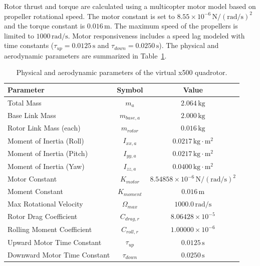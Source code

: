     Rotor thrust and torque are calculated using a multicopter motor model based on propeller rotational speed. The motor constant is set to $8.55 \times 10^{-6}\,\text{N}/(\text{rad/s})^2$ and the torque constant is $0.016\,\text{m}$. The maximum speed of the propellers is limited to $1000\,\text{rad/s}$. Motor responsiveness includes a speed lag modeled with time constants ($\tau_{up} = 0.0125\,\text{s}$ and $\tau_{down} = 0.0250\,\text{s}$). The physical and aerodynamic parameters are summarized in Table~\ref{tab:uav_parameters}.

    \begin{table}[H]
        \centering
        \caption{Physical and aerodynamic parameters of the virtual x500 quadrotor.}
        \label{tab:uav_parameters}
        \begin{tabular}{lcc}
            \toprule
            \textbf{Parameter} & \textbf{Symbol} & \textbf{Value} \\
            \midrule
            Total Mass & $m_a$ & $2.064\,\text{kg}$ \\
            Base Link Mass & $m_{base,a}$ & $2.000\,\text{kg}$ \\
            Rotor Link Mass (each) & $m_{rotor}$ & $0.016\,\text{kg}$ \\
            Moment of Inertia (Roll) & $I_{xx,a}$ & $0.0217\,\text{kg}\cdot\text{m}^2$ \\
            Moment of Inertia (Pitch) & $I_{yy,a}$ & $0.0217\,\text{kg}\cdot\text{m}^2$ \\
            Moment of Inertia (Yaw) & $I_{zz,a}$ & $0.0400\,\text{kg}\cdot\text{m}^2$ \\
            Motor Constant & $K_{motor}$ & $8.54858 \times 10^{-6}\,\text{N}/(\text{rad/s})^2$ \\
            Moment Constant & $K_{moment}$ & $0.016\,\text{m}$ \\
            Max Rotational Velocity & $\Omega_{max}$ & $1000.0\,\text{rad/s}$ \\
            Rotor Drag Coefficient & $C_{drag,r}$ & $8.06428 \times 10^{-5}$ \\
            Rolling Moment Coefficient & $C_{roll,r}$ & $1.00000 \times 10^{-6}$ \\
            Upward Motor Time Constant & $\tau_{up}$ & $0.0125\,\text{s}$ \\
            Downward Motor Time Constant & $\tau_{down}$ & $0.0250\,\text{s}$ \\
            \bottomrule
        \end{tabular}
    \end{table}

